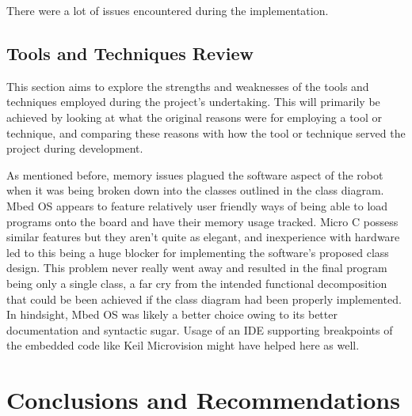 	There were a lot of issues encountered during the implementation.
	
		\section{Tools and Techniques Review}
		This section aims to explore the strengths and weaknesses of the tools and techniques employed during the project's undertaking. This will primarily be achieved by looking at what the original reasons were for employing a tool or technique, and comparing these reasons with how the tool or technique served the project during development.
		
		As mentioned before, memory issues plagued the software aspect of the robot when it was being broken down into the classes outlined in the class diagram. Mbed OS appears to feature relatively user friendly ways of being able to load programs onto the board and have their memory usage tracked. Micro C possess similar features but they aren't quite as elegant, and inexperience with hardware led to this being a huge blocker for implementing the software's proposed class design. This problem never really went away and resulted in the final program being only a single class, a far cry from the intended functional decomposition that could be been achieved if the class diagram had been properly implemented. In hindsight, Mbed OS was likely a better choice owing to its better documentation and syntactic sugar. Usage of an IDE supporting breakpoints of the embedded code like Keil Microvision might have helped here as well.
	
	
	\chapter{Conclusions and Recommendations}
	
	
	
	

